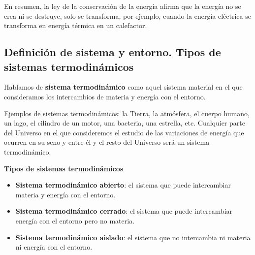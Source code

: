 \documentclass[
  spanish,
]{article}
\begin{document}
En resumen, la ley de la conservación de la energía afirma que la
energía no se crea ni se destruye, solo se transforma, por ejemplo,
cuando la energía eléctrica se transforma en energía térmica en un
calefactor.

\hypertarget{definiciuxf3n-de-sistema-y-entorno.-tipos-de-sistemas-termodinuxe1micos}{%
\subsection{Definición de sistema y entorno. Tipos de sistemas
termodinámicos}\label{definiciuxf3n-de-sistema-y-entorno.-tipos-de-sistemas-termodinuxe1micos}}

\hfill{}Hablamos
de \textbf{sistema termodinámico} como aquel sistema material en el que
consideramos los intercambios de materia y energía con el entorno.

Ejemplos de sistemas termodinámicos: la Tierra, la atmósfera, el cuerpo
humano, un lago, el cilindro de un motor, una bacteria, una estrella,
etc. Cualquier parte del Universo en el que consideremos el estudio de
las variaciones de energía que ocurren en su seno y entre él y el resto
del Universo será un sistema termodinámico.

\textbf{Tipos de sistemas termodinámicos}

\begin{itemize}
\item
  \textbf{Sistema termodinámico abierto}: el sistema que puede
  intercambiar materia y energía con el entorno.
\item
  \textbf{Sistema termodinámico cerrado}: el sistema que puede
  intercambiar energía con el entorno pero no materia.
\item
  \textbf{Sistema termodinámico aislado}: el sistema que no intercambia
  ni materia ni energía con el entorno.
\end{itemize}

\hfill{}
\end{document}
